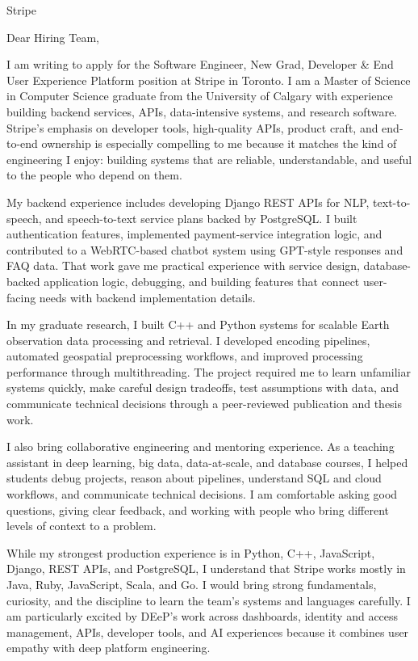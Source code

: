 \documentclass[11pt]{letter}
\begin{document}
\begin{letter}{Stripe}

\opening{Dear Hiring Team,}

I am writing to apply for the Software Engineer, New Grad, Developer \& End User Experience Platform position at Stripe in Toronto. I am a Master of Science in Computer Science graduate from the University of Calgary with experience building backend services, APIs, data-intensive systems, and research software. Stripe's emphasis on developer tools, high-quality APIs, product craft, and end-to-end ownership is especially compelling to me because it matches the kind of engineering I enjoy: building systems that are reliable, understandable, and useful to the people who depend on them.

My backend experience includes developing Django REST APIs for NLP, text-to-speech, and speech-to-text service plans backed by PostgreSQL. I built authentication features, implemented payment-service integration logic, and contributed to a WebRTC-based chatbot system using GPT-style responses and FAQ data. That work gave me practical experience with service design, database-backed application logic, debugging, and building features that connect user-facing needs with backend implementation details.

In my graduate research, I built C++ and Python systems for scalable Earth observation data processing and retrieval. I developed encoding pipelines, automated geospatial preprocessing workflows, and improved processing performance through multithreading. The project required me to learn unfamiliar systems quickly, make careful design tradeoffs, test assumptions with data, and communicate technical decisions through a peer-reviewed publication and thesis work.

I also bring collaborative engineering and mentoring experience. As a teaching assistant in deep learning, big data, data-at-scale, and database courses, I helped students debug projects, reason about pipelines, understand SQL and cloud workflows, and communicate technical decisions. I am comfortable asking good questions, giving clear feedback, and working with people who bring different levels of context to a problem.

While my strongest production experience is in Python, C++, JavaScript, Django, REST APIs, and PostgreSQL, I understand that Stripe works mostly in Java, Ruby, JavaScript, Scala, and Go. I would bring strong fundamentals, curiosity, and the discipline to learn the team's systems and languages carefully. I am particularly excited by DEeP's work across dashboards, identity and access management, APIs, developer tools, and AI experiences because it combines user empathy with deep platform engineering.


\end{letter}
\end{document}
